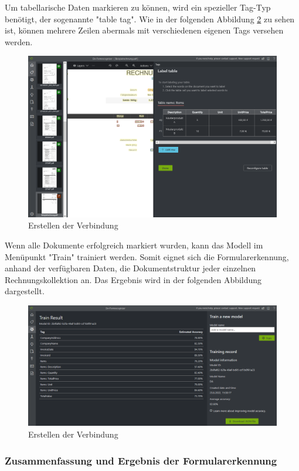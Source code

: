 Um tabellarische Daten markieren zu können, wird ein spezieller Tag-Typ benötigt, der sogenannte "table tag". Wie in der folgenden Abbildung 
\ref{fig:formrecognizer-invoice-tagging-items} zu sehen ist, können mehrere Zeilen abermals mit verschiedenen eigenen Tags versehen werden.

\begin{figure}[h]
    \centering
    \includegraphics[scale=0.4]{sections/cloud-computing/images/formrecognizer-invoice-tagging-items.PNG}
    \caption{Erstellen der Verbindung}
    \label{fig:formrecognizer-invoice-tagging-items}
\end{figure}

Wenn alle Dokumente erfolgreich markiert wurden, kann das Modell im Menüpunkt "Train" trainiert werden. Somit eignet sich die Formularerkennung, anhand der 
verfügbaren Daten, die Dokumentstruktur jeder einzelnen Rechnungskollektion an. Das Ergebnis wird in der folgenden Abbildung dargestellt.

\begin{figure}[h]
    \centering
    \includegraphics[scale=0.4]{sections/cloud-computing/images/formrecognizer-model-overview.PNG}
    \caption{Erstellen der Verbindung}
    \label{fig:formrecognizer-invoice-tagging-items}
\end{figure}

\subsubsection{Zusammenfassung und Ergebnis der Formularerkennung}
